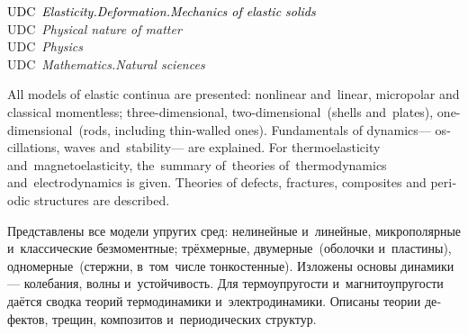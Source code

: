 \begin{minipage}[b]{0.92\linewidth}
{\begin{otherlanguage}{russian}
\end{otherlanguage}

\vspace{\baselineskip}

\begin{otherlanguage}{english}

{\footnotesize%
\textcolor{black}{UDC~\emph{Elasticity.\:Deformation.\:Mechanics of elastic solids}}\\
\textcolor{black!50}{UDC~\emph{Physical nature of matter}}\\
\textcolor{black!40}{UDC~\emph{Physics}}\\
\textcolor{black!30}{UDC~\emph{Mathematics.\:Natural sciences}}%
\par}

\end{otherlanguage}

\vspace{0.25\paperheight}

\begin{otherlanguage}{english}

All models of elastic continua are presented: nonlinear and~\hbox{linear}, micropolar and classical momentless; three-di\-men\-sion\-al, two-di\-men\-sion\-al~(shells and~plates), one-di\-men\-sion\-al~(rods, including thin\hbox{-}walled ones).
Fundamentals of dynamics\:--- oscillations, waves and~stability\:--- are explained.
For thermo\-elasticity and~magneto\-elasticity, the~summary of~theories of~thermo\-dynamics and~electro\-dynamics is given.
Theories of defects, fractures, composites and periodic structures are described.


\end{otherlanguage}

\vspace{1.2\baselineskip}

\begin{otherlanguage}{russian}

Представлены все модели упругих сред: нелинейные и~линейные, микрополярные и~классические безмоментные; трёх\-мерные, дву\-мерные~(оболочки и~пластины), одно\-мерные~(стержни, в~том~числе тонко\-стен\-ные).
Изложены основы динамики\:--- колебания, волны и~устойчивость.
Для термо\-упругости и~магнито\-упругости даётся сводка теорий термо\-динамики и~электро\-динамики.
Описаны теории дефектов, трещин, композитов и~периодических структур.

\end{otherlanguage}

}
\end{minipage}

\thispagestyle{empty}

\newpage
